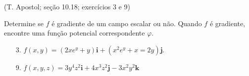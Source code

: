 \documentclass[../main.tex]{subfiles}
\begin{document}
	\begin{exercicio}{4}
		(T. Apostol; seção 10.18; exercícios 3 e 9)
		
		Determine se $f$ é gradiente de um campo escalar ou não. Quando $f$ é gradiente, encontre uma função potencial correspondente $\varphi$.
		\begin{enumerate} 
			\item[3.] $f(x,y)=(2xe^y+y)\textbf{i}+(x^2e^y+x=2y)\textbf{j}$.
			\item[9.] $f(x,y,z)=3y^4z^2\textbf{i}+4x^3z^2\textbf{j}-3x^2y^2\textbf{k}$
		\end{enumerate}
	\end{exercicio}
\end{document}
